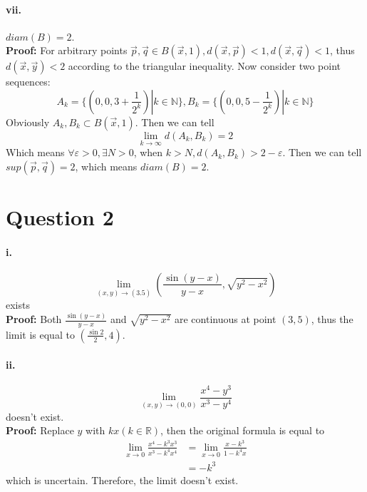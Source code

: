 \documentclass[11pt, a4paper]{article}
\begin{document}
\paragraph{vii.}
$diam(B) = 2$.\\
\textbf{Proof:} For arbitrary points $\vec{p}, \vec{q} \in B(\vec{x}, 1), d(\vec{x}, \vec{p}) < 1, d(\vec{x}, \vec{q}) < 1$, thus $d(\vec{x}, \vec{y}) < 2$ according to the triangular inequality.
Now consider two point sequences:
$$A_k = \{ (0, 0, 3 + \frac{1}{2 ^ k}) | k \in \mathbb{N} \}, B_k = \{ (0, 0, 5 - \frac{1}{2 ^ k}) | k \in \mathbb{N} \}$$
Obviously $A_k, B_k \subset B(\vec{x}, 1)$.
Then we can tell
$$\lim_{k \to \infty} d(A_k, B_k) = 2$$
Which means $\forall \varepsilon > 0, \exists N > 0$, when $k > N, d(A_k, B_k) > 2 - \varepsilon$. Then we can tell $sup(\vec{p}, \vec{q}) = 2$, which means $diam(B) = 2$.


\section*{Question 2}

\paragraph{i.}
$$\lim_{(x, y) \to (3.5)} (\frac{\sin (y - x)}{y - x}, \sqrt{y ^ 2 - x ^ 2})$$ exists \\
\textbf{Proof:} Both $\frac{\sin (y - x)}{y - x}$ and $\sqrt{y ^ 2 - x ^ 2}$ are continuous at point $(3, 5)$, thus the limit is equal to $(\frac{\sin 2}{2}, 4)$.

\paragraph{ii.}
$$\lim_{(x, y) \to (0, 0)} \frac{x ^ 4 - y ^ 3}{x ^ 3 - y ^ 4}$$ doesn't exist. \\
\textbf{Proof:} Replace $y$ with $kx (k \in \mathbb{R})$, then the original formula is equal to 
$$\begin{aligned}
    \lim_{x \to 0} \frac{x ^ 4 - k ^ 3 x ^ 3}{x ^ 3 - k ^ 4 x ^ 4} &= \lim_{x \to 0} \frac{x - k ^ 3}{1 - k ^ 4 x} \\
    &= -k ^ 3
\end{aligned}$$ which is uncertain. Therefore, the limit doesn't exist.
\end{document}
